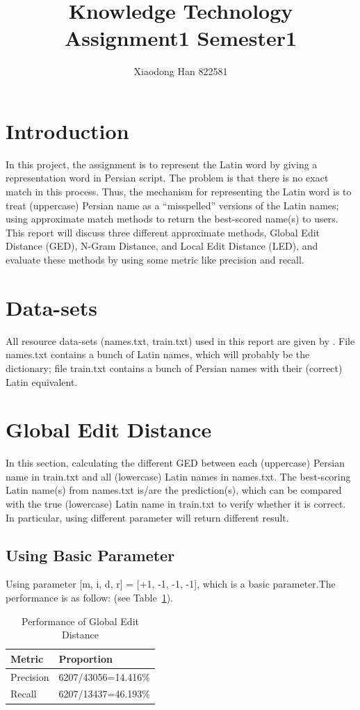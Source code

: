 \documentclass[11pt]{article}
\title{Knowledge Technology Assignment1 Semester1}
\author{Xiaodong Han 822581}
\begin{document}
\maketitle

\section{Introduction}
In this project, the assignment is to represent the Latin word by giving a representation word in Persian script. The problem is that there is no exact match in this process. Thus, the mechanism for representing the Latin word is to treat (uppercase) Persian name as a “misspelled” versions of the Latin names; using approximate match methods to return the best-scored name(s) to users. This report will discuss three different approximate methods, Global Edit Distance (GED), N-Gram Distance, and Local Edit Distance (LED), and evaluate these methods by using some metric like precision and recall.



\section{Data-sets}
All resource data-sets (names.txt, train.txt) used in this report are given by . File names.txt contains a bunch of Latin names, which will probably be the dictionary; file train.txt contains a bunch of Persian names with their (correct) Latin equivalent.


\section{Global Edit Distance}
In this section, calculating the different GED between each (uppercase) Persian name in train.txt and all (lowercase) Latin names in names.txt. The best-scoring Latin name(s) from names.txt is/are the prediction(s), which can be compared with the true (lowercase) Latin name in train.txt to verify whether it is correct. In particular, using different parameter will return different result.

\subsection{Using Basic Parameter}
Using parameter [m, i, d, r] = [+1, -1, -1, -1], which is a basic parameter.The performance is as follow: (see Table~\ref{table1}).

\begin{table}[h]
 \begin{center}
\begin{tabular}{|l|l|}

      \hline
      Metric & Proportion\\
      \hline\hline
      Precision & 6207/43056=14.416\%\\
      Recall & 6207/13437=46.193\%\\
      \hline

\end{tabular}
\caption{Performance of Global Edit Distance}\label{table1}
\end{center}
\end{table}
\end{document}
